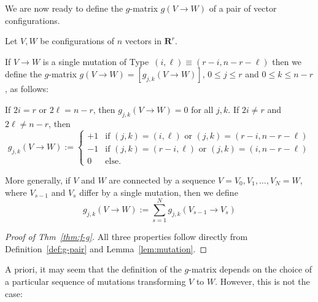 \documentclass[a4paper,USenglish,cleveref, autoref, thm-restate,nolineno]{socg-lipics-v2021}
\renewcommand{\leq}{\leqslant}
\newcommand{\R}{\mathbf{R}}
\begin{document}
We are now ready to define the $g$-matrix $g(V\rightarrow W)$ of a pair of vector configurations.  
\begin{definition}
\label{def:g-pair}
Let $V,W$ be configurations of $n$ vectors in $\R^r$. 

If $V\to W$ is a single mutation of Type~$(i,\ell)\equiv(r-i,n-r-\ell)$ then we define the $g$-matrix 
$g(V\rightarrow W)=[g_{j,k}(V\rightarrow W)]$, $0\leq j\leq r$ and $0\leq k \leq n-r$, as follows: 

If $2i=r$ or $2\ell=n-r$, then $g_{j,k}(V\to W)=0$ for all $j,k$. If $2i\neq r$ and $2\ell\neq n-r$, then
\[
g_{j,k}(V\to W):= 
\begin{cases}
  +1 & \textrm{if } (j,k)=(i,\ell) \textrm{ or }(j,k)=(r-i,n-r-\ell)\\
  -1 & \textrm{if } (j,k)=(r-i,\ell) \textrm{ or }(j,k)=(i,n-r-\ell)\\
  0 & \textrm{else.}  
\end{cases}
\]


More generally, if $V$ and $W$ are connected by a sequence $V=V_0, V_1,\dots, V_N=W$, where $V_{s-1}$ and $V_s$ differ by a single mutation, then we define
\[
g_{j,k}(V\to W):= \sum_{s=1}^N g_{j,k}(V_{s-1}\to V_s)
\]
\end{definition}

\begin{proof}[Proof of Thm~\ref{thm:f-g}]
All three properties follow directly from Definition~\ref{def:g-pair} and Lemma~\ref{lem:mutation}.
\end{proof}

A priori, it may seem that the definition of the $g$-matrix depends on the choice of a particular sequence of mutations transforming $V$ to $W$. However, this is not the case: 
\end{document}

